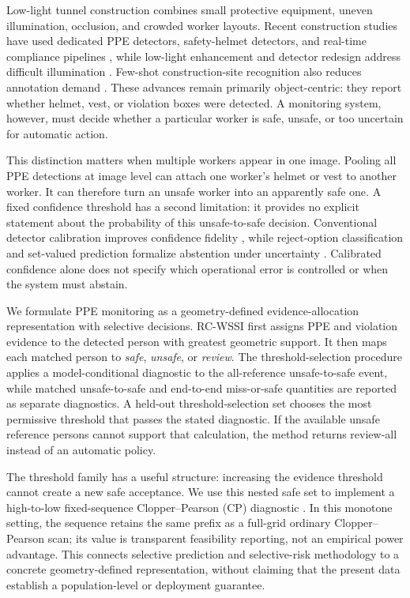 \documentclass[iicol,pdflatex,sn-mathphys-num]{sn-jnl}
\begin{document}
Low-light tunnel construction combines small protective equipment, uneven illumination, occlusion, and crowded worker layouts. Recent construction studies have used dedicated PPE detectors, safety-helmet detectors, and real-time compliance pipelines \cite{nath2020site,wang2021fastppe,delhi2020ppe,li2020helmet,han2022helmet,lo2022ppe}, while low-light enhancement and detector redesign address difficult illumination \cite{wang2023lowlight,malaikrisanachalee2025espcn,wu2025enhanced}. Few-shot construction-site recognition also reduces annotation demand \cite{wang2024fewshot}. These advances remain primarily object-centric: they report whether helmet, vest, or violation boxes were detected. A monitoring system, however, must decide whether a particular worker is safe, unsafe, or too uncertain for automatic action.

This distinction matters when multiple workers appear in one image. Pooling all PPE detections at image level can attach one worker's helmet or vest to another worker. It can therefore turn an unsafe worker into an apparently safe one. A fixed confidence threshold has a second limitation: it provides no explicit statement about the probability of this unsafe-to-safe decision. Conventional detector calibration improves confidence fidelity \cite{oksuz2023selfaware,pathiraja2023multiclass,le2018uncertainty}, while reject-option classification and set-valued prediction formalize abstention under uncertainty \cite{herbei2006reject,sadinle2018least}. Calibrated confidence alone does not specify which operational error is controlled or when the system must abstain.

We formulate PPE monitoring as a geometry-defined evidence-allocation representation with selective decisions. RC-WSSI first assigns PPE and violation evidence to the detected person with greatest geometric support. It then maps each matched person to \emph{safe}, \emph{unsafe}, or \emph{review}. The threshold-selection procedure applies a model-conditional diagnostic to the all-reference unsafe-to-safe event, while matched unsafe-to-safe and end-to-end miss-or-safe quantities are reported as separate diagnostics. A held-out threshold-selection set chooses the most permissive threshold that passes the stated diagnostic. If the available unsafe reference persons cannot support that calculation, the method returns review-all instead of an automatic policy.

The threshold family has a useful structure: increasing the evidence threshold cannot create a new safe acceptance. We use this nested safe set to implement a high-to-low fixed-sequence Clopper--Pearson (CP) diagnostic \cite{clopper1934confidence}. In this monotone setting, the sequence retains the same prefix as a full-grid ordinary Clopper--Pearson scan; its value is transparent feasibility reporting, not an empirical power advantage. This connects selective prediction \cite{geifman2017selective} and selective-risk methodology \cite{angelopoulos2021learntest,angelopoulos2022conformal} to a concrete geometry-defined representation, without claiming that the present data establish a population-level or deployment guarantee.
\end{document}

